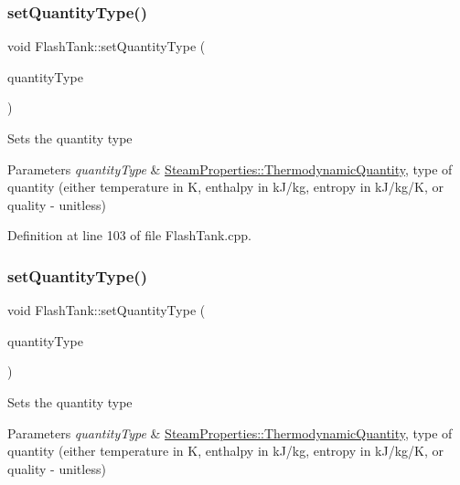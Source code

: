\subsubsection{\texorpdfstring{set\+Quantity\+Type()}{setQuantityType()}\hspace{0.1cm}{\footnotesize\ttfamily [2/3]}}
{\footnotesize\ttfamily void Flash\+Tank\+::set\+Quantity\+Type (\begin{DoxyParamCaption}\item[{\hyperlink{class_steam_properties_ae0294bedf7d178c2d8fb6aed0f62fbff}{Steam\+Properties\+::\+Thermodynamic\+Quantity}}]{quantity\+Type }\end{DoxyParamCaption})}

Sets the quantity type 
\begin{DoxyParams}{Parameters}
{\em quantity\+Type} & \hyperlink{class_steam_properties_ae0294bedf7d178c2d8fb6aed0f62fbff}{Steam\+Properties\+::\+Thermodynamic\+Quantity}, type of quantity (either temperature in K, enthalpy in k\+J/kg, entropy in k\+J/kg/K, or quality -\/ unitless) \\
\hline
\end{DoxyParams}


Definition at line 103 of file Flash\+Tank.\+cpp.

\mbox{\label{class_flash_tank_a30aa7a42d1547f61b176da4a15e8e8ee}} 
\subsubsection{\texorpdfstring{set\+Quantity\+Type()}{setQuantityType()}\hspace{0.1cm}{\footnotesize\ttfamily [3/3]}}
{\footnotesize\ttfamily void Flash\+Tank\+::set\+Quantity\+Type (\begin{DoxyParamCaption}\item[{\hyperlink{class_steam_properties_ae0294bedf7d178c2d8fb6aed0f62fbff}{Steam\+Properties\+::\+Thermodynamic\+Quantity}}]{quantity\+Type }\end{DoxyParamCaption})}

Sets the quantity type 
\begin{DoxyParams}{Parameters}
{\em quantity\+Type} & \hyperlink{class_steam_properties_ae0294bedf7d178c2d8fb6aed0f62fbff}{Steam\+Properties\+::\+Thermodynamic\+Quantity}, type of quantity (either temperature in K, enthalpy in k\+J/kg, entropy in k\+J/kg/K, or quality -\/ unitless) \\
\hline
\end{DoxyParams}
\mbox{\label{class_flash_tank_ac7392743aeaf8de6ce368814ea42e236}} 
